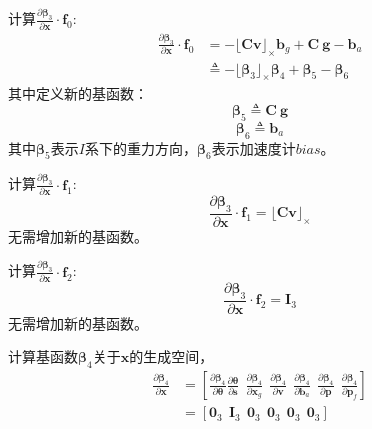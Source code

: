 \documentclass{article}
\begin{document}
\par
计算$\frac{\partial\mathbf{\beta}_3}{\partial\textbf{x}}\cdot\textbf{f}_0$:
\begin{equation}
    \begin{array}{ll}
        \frac{\partial\mathbf{\beta}_3}{\partial\textbf{x}}\cdot\textbf{f}_0
        &=-\lfloor\textbf{Cv}\rfloor_{\times}\textbf{b}_{g}+\textbf{C}\ \textbf{g}-\textbf{b}_{a}\\
        &\triangleq -\lfloor\mathbf{\beta}_3\rfloor_{\times}\mathbf{\beta}_{4}+\mathbf{\beta}_{5}-\mathbf{\beta}_{6}
    \end{array}
\end{equation}
其中定义新的基函数：
\begin{equation}
    \mathbf{\beta}_5 \triangleq \textbf{C}\ \textbf{g}
\end{equation}
\begin{equation}
    \mathbf{\beta}_6 \triangleq \textbf{b}_{a}
\end{equation}
其中$\mathbf{\beta}_5$表示$I$系下的重力方向，$\mathbf{\beta}_6表示加速度计bias$。

\par
计算$\frac{\partial\mathbf{\beta}_3}{\partial\textbf{x}}\cdot\textbf{f}_1$:
\begin{equation}
    \frac{\partial\mathbf{\beta}_3}{\partial\textbf{x}}\cdot\textbf{f}_1
    =\lfloor\textbf{Cv}\rfloor_{\times}
\end{equation}
无需增加新的基函数。

\par
计算$\frac{\partial\mathbf{\beta}_3}{\partial\textbf{x}}\cdot\textbf{f}_2$:
\begin{equation}
    \frac{\partial\mathbf{\beta}_3}{\partial\textbf{x}}\cdot\textbf{f}_2=\textbf{I}_3
\end{equation}
无需增加新的基函数。

\par
计算基函数$\mathbf{\beta}_4$关于$\textbf{x}$的生成空间，
\begin{equation}
    \begin{array}{ll}\frac{\partial\mathbf{\beta}_4}{\partial\textbf{x}}
        &=\left[\frac{\partial\mathbf{\beta}_4}{\partial\mathbf{\theta}}\frac{\partial\mathbf{\theta}}{\partial\textbf{s}}
        \ \ \frac{\partial\mathbf{\beta}_4}{\partial\textbf{x}_{g}}\ \ \frac{\partial\mathbf{\beta}_4}{\partial\textbf{v}}
        \ \ \frac{\partial\mathbf{\beta}_4}{\partial\textbf{b}_{a}}\ \ \frac{\partial\mathbf{\beta}_4}{\partial\textbf{p}}
        \ \ \frac{\partial\mathbf{\beta}_4}{\partial\textbf{p}_f}\right]\\
        &=\left[\textbf{0}_3\ \ \textbf{I}_3\ \ \textbf{0}_3\ \ \textbf{0}_3\ \ \textbf{0}_3\ \ \textbf{0}_3\right]
    \end{array}
\end{equation}
\end{document}
